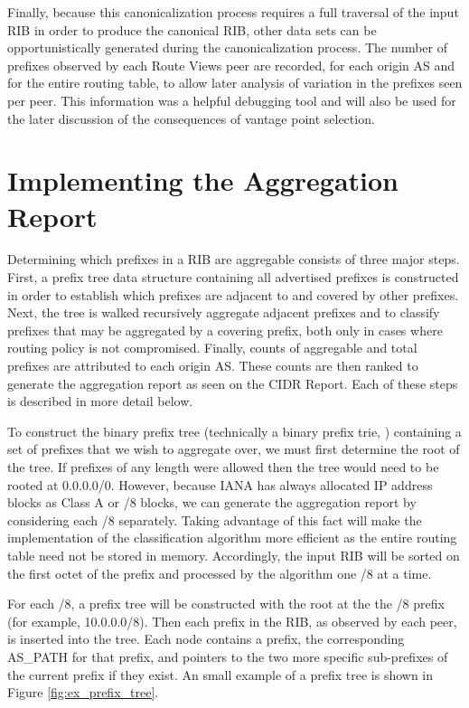 Finally, because this canonicalization process requires a full traversal of the input RIB in order to produce the canonical RIB, other data sets can be opportunistically generated during the canonicalization process. The number of prefixes observed by each Route Views peer are recorded, for each origin AS and for the entire routing table, to allow later analysis of variation in the prefixes seen per peer. This information was a helpful debugging tool and will also be used for the later discussion of the consequences of vantage point selection.

\section{Implementing the Aggregation Report}

Determining which prefixes in a RIB are aggregable consists of three major steps. First, a prefix tree data structure containing all advertised prefixes is constructed in order to establish which prefixes are adjacent to and covered by other prefixes. Next, the tree is walked recursively aggregate adjacent prefixes and to classify prefixes that may be aggregated by a covering prefix, both only in cases where routing policy is not compromised. Finally, counts of aggregable and total prefixes are attributed to each origin AS. These counts are then ranked to generate the aggregation report as seen on the CIDR Report. Each of these steps is described in more detail below.

To construct the binary prefix tree (technically a binary prefix trie, \cite{Wu:2008fk}) containing a set of prefixes that we wish to aggregate over, we must first determine the root of the tree. If prefixes of any length were allowed then the tree would need to be rooted at 0.0.0.0/0. However, because IANA has always allocated IP address blocks as Class A or /8 blocks, we can generate the aggregation report by considering each /8 separately. Taking advantage of this fact will make the implementation of the classification algorithm more efficient as the entire routing table need not be stored in memory. Accordingly, the input RIB will be sorted on the first octet of the prefix and processed by the algorithm one /8 at a time.

For each /8, a prefix tree will be constructed with the root at the the /8 prefix (for example, 10.0.0.0/8). Then each prefix in the RIB, as observed by each peer, is inserted into the tree. Each node contains a prefix, the corresponding AS\_PATH for that prefix, and pointers to the two more specific sub-prefixes of the current prefix if they exist. An small example of a prefix tree is shown in Figure \ref{fig:ex_prefix_tree}.

